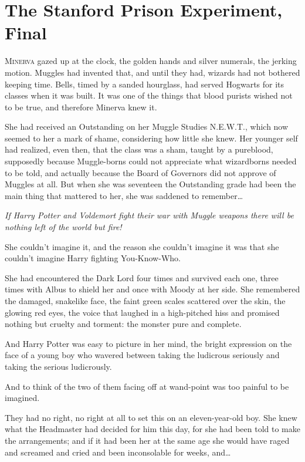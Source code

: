 \chapter{The Stanford Prison Experiment, Final}

\lettrine{M}{inerva} gazed up at the clock, the golden hands and silver numerals, the jerking motion. Muggles had invented that, and until they had, wizards had not bothered keeping time. Bells, timed by a sanded hourglass, had served Hogwarts for its classes when it was built. It was one of the things that blood purists wished not to be true, and therefore Minerva knew it.

She had received an Outstanding on her Muggle Studies N.E.W.T., which now seemed to her a mark of shame, considering how little she knew. Her younger self had realized, even then, that the class was a sham, taught by a pureblood, supposedly because Muggle-borns could not appreciate what wizardborns needed to be told, and actually because the Board of Governors did not approve of Muggles at all. But when she was seventeen the Outstanding grade had been the main thing that mattered to her, she was saddened to remember…

\emph{If Harry Potter and Voldemort fight their war with Muggle weapons there will be nothing left of the world but fire!}

She couldn’t imagine it, and the reason she couldn’t imagine it was that she couldn’t imagine Harry fighting You-Know-Who.

She had encountered the Dark Lord four times and survived each one, three times with Albus to shield her and once with Moody at her side. She remembered the damaged, snakelike face, the faint green scales scattered over the skin, the glowing red eyes, the voice that laughed in a high-pitched hiss and promised nothing but cruelty and torment: the monster pure and complete.

And Harry Potter was easy to picture in her mind, the bright expression on the face of a young boy who wavered between taking the ludicrous seriously and taking the serious ludicrously.

And to think of the two of them facing off at wand-point was too painful to be imagined.

They had no right, no right at all to set this on an eleven-year-old boy. She knew what the Headmaster had decided for him this day, for she had been told to make the arrangements; and if it had been her at the same age she would have raged and screamed and cried and been inconsolable for weeks, and…

